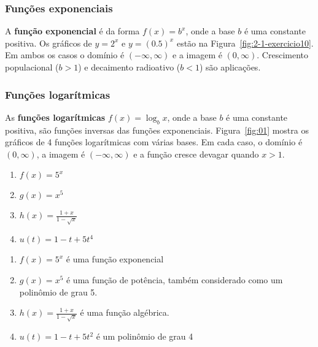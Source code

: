 \subsubsection{Funções exponenciais}

A \textbf{função exponencial} é da forma $f(x)=b^x$, onde a base $b$ é uma constante positiva. Os gráficos de $y=2^x$ e $y=(0.5)^x$ estão na Figura~\ref{fig:2-1-exercicio10}. Em ambos os casos o domínio é $(-\infty, \infty)$ e a imagem é $(0,\infty)$. Crescimento populacional ($b > 1$) e decaimento radioativo ($b < 1$) são aplicações.
\vspace{-0.5cm}\begin{figure}[!ht]
	\centering
	\caption{}\label{fig:exponential-functions}
\end{figure}
\subsubsection{Funções logarítmicas}

As \textbf{funções logarítmicas} $f(x)=\log_bx$, onde a base $b$ é uma constante positiva, são funções inversas das funções exponenciais. Figura~\ref{fig:01} mostra os gráficos de 4 funções logarítmicas com várias bases. Em cada caso, o domínio é $(0,\infty)$, a imagem é $(-\infty, \infty)$ e a função cresce devagar quando $x > 1$.
\begin{enumerate}[label=(alph*)]
	\item $f(x) = 5^x$
	\item $g(x) = x^5$
	\item $h(x) = \frac{1+x}{1-\sqrt{x}}$
	\item $u(t) = 1-t+ 5t^4$
\end{enumerate}
\solution
\begin{enumerate}[label=(alph*)]
	\item $f(x)=5^x$ é uma função exponencial
	\item $g(x)=x^5$ é uma função de potência, também considerado como um polinômio de grau 5.
	\item $h(x) = \frac{1+x}{1-\sqrt{x}}$ é uma função algébrica.
	\item $u(t)= 1-t+5t^2$  é um polinômio de grau 4
\end{enumerate}

